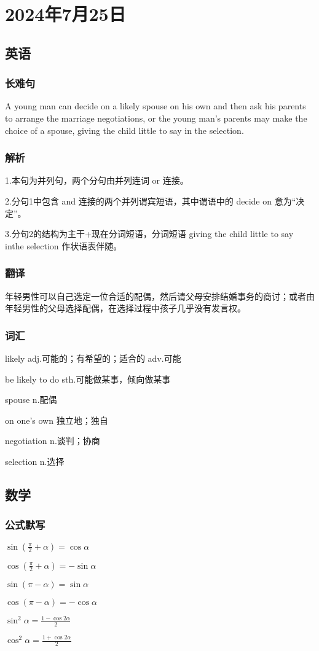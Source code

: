 \documentclass[UTF8]{ctexart}
\begin{document}
\section{2024年7月25日}
\subsection{英语}
\subsubsection{长难句}
A young man can decide on a likely spouse on his own and then ask his parents to arrange the marriage negotiations, or the young man's parents may make the choice of a spouse, giving the child little to say in the selection.
\subsubsection{解析}
1.本句为并列句，两个分句由并列连词 or 连接。

2.分句1中包含 and 连接的两个并列谓宾短语，其中谓语中的 decide on 意为“决定”。

3.分句2的结构为主干+现在分词短语，分词短语 giving the child little to say inthe selection 作状语表伴随。
\subsubsection{翻译}
年轻男性可以自己选定一位合适的配偶，然后请父母安排结婚事务的商讨；或者由年轻男性的父母选择配偶，在选择过程中孩子几乎没有发言权。
\subsubsection{词汇}
likely adj.可能的；有希望的；适合的 adv.可能

be likely to do sth.可能做某事，倾向做某事

spouse n.配偶

on one's own 独立地；独自

negotiation n.谈判；协商

selection n.选择
\subsection{数学}
\subsubsection{公式默写}
\begin{multicols}{3}
      $\sin\left ( \frac{\pi}{2} + \alpha  \right ) =\cos \alpha$

      $\cos\left ( \frac{\pi}{2}+\alpha\right )=-\sin \alpha$

      $\sin \left ( \pi - \alpha\right )=\sin \alpha$

      $\cos \left ( \pi - \alpha\right )=-\cos \alpha$

      $\sin^2\alpha=\frac{1-\cos 2\alpha}{2}$

      $\cos^2\alpha=\frac{1+\cos 2\alpha}{2}$
\end{multicols}
\end{document}
